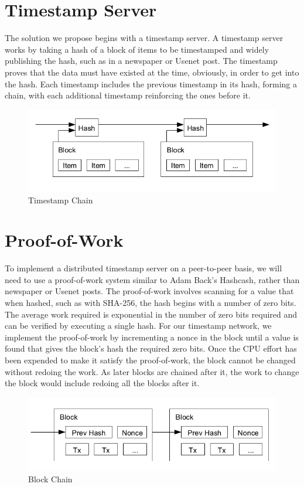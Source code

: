 \section{Timestamp Server}

The solution we propose begins with a timestamp server. A timestamp server works by taking a hash of a block of items to be timestamped and widely publishing the hash, such as in a newspaper or Usenet post. The timestamp proves that the data must have existed at the time, obviously, in order to get into the hash. Each timestamp includes the previous timestamp in its hash, forming a chain, with each additional timestamp reinforcing the ones before it\cite{nakamoto2012bitcoin}.

\begin{figure}[ht!]
\centering
\includegraphics[trim = 0mm 0mm 0mm 0mm, width=120mm]{images/timestamp}
\caption{Timestamp Chain}
\end{figure}

\section{Proof-of-Work}

To implement a distributed timestamp server on a peer-to-peer basis, we will need to use a proof-of-work system similar to Adam Back's Hashcash, rather than newspaper or Usenet posts. The proof-of-work involves scanning for a value that when hashed, such as with SHA-256, the hash begins with a number of zero bits. The average work required is exponential in the number of zero bits required and can be verified by executing a single hash.
For our timestamp network, we implement the proof-of-work by incrementing a nonce in the block until a value is found that gives the block's hash the required zero bits. Once the CPU effort has been expended to make it satisfy the proof-of-work, the block cannot be changed without redoing the work. As later blocks are chained after it, the work to change the block would include redoing all the blocks after it\cite{nakamoto2012bitcoin}.

\begin{figure}[ht!]
\centering
\includegraphics[trim = 0mm 0mm 0mm 0mm, width=120mm]{images/block_chain}
\caption{Block Chain}
\end{figure}

